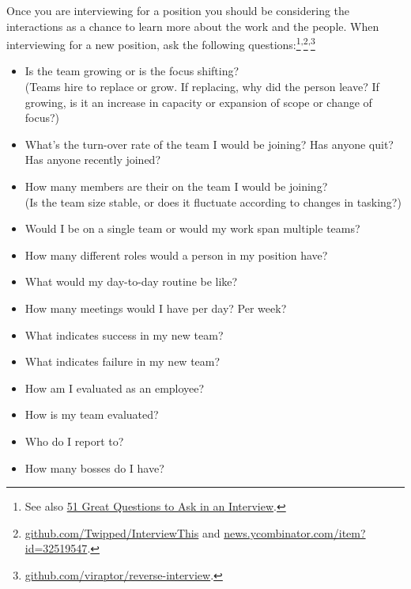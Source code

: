 Once you are interviewing for a position you should be considering the interactions as a chance to learn more about the work and the people. When interviewing for a new position, ask the following questions:\footnote{See also \href{https://www.themuse.com/advice/51-interview-questions-you-should-be-asking}{51 Great Questions to Ask in an Interview}\iftoggle{boundbook}{, https://www.themuse.com}{}.}\textsuperscript{,}\footnote{
\href{https://github.com/Twipped/InterviewThis}{github.com/Twipped/InterviewThis} and 
\href{https://news.ycombinator.com/item?id=32519547}{news.ycombinator.com/item?id=32519547}.}\textsuperscript{,}\footnote{
\href{https://github.com/viraptor/reverse-interview}{github.com/viraptor/reverse-interview}.
}
\begin{itemize}
    \item Is the team growing or is the focus shifting? \\
    (Teams hire to replace or grow. If replacing, why did the person leave? If growing, is it an increase in capacity or expansion of scope or change of focus?)
    \item What's the turn-over rate of the team I would be joining? Has anyone quit? Has anyone recently joined?
    \item How many members are their on the team I would be joining?\\
    (Is the team size stable, or does it fluctuate according to changes in tasking?)
    \item Would I be on a single team or would my work span multiple teams?
    \item How many different roles would a person in my position have? 
    
    \item What would my day-to-day routine be like?
    \item How many meetings would I have per day? Per week?

    \item What indicates success in my new team? 
    \item What indicates failure in my new team? 
    \item How am I evaluated as an employee?
    \item How is my team evaluated?

    \item Who do I report to? 
    \item How many bosses do I have?


\end{itemize}
